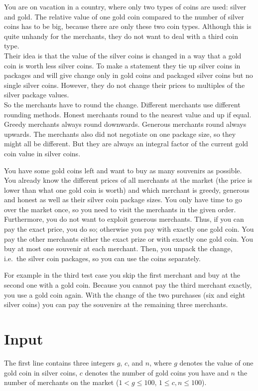 
You are on vacation in a country, where only two types of coins are used: silver and
gold. The relative value of one gold coin compared to the number of
silver coins has to be big, because there are only these two coin types.
Although this is quite unhandy for the merchants, they do not want to deal with
a third coin type.\\
Their idea is that the value of the silver coins is changed in a way that a
gold coin is worth less silver coins. To make a statement they tie up silver
coins in packages and will give change only in gold coins and packaged silver
coins but no single silver coins.  However, they do not change their prices to
multiples of the silver package values.\\
So the merchants have to round the change.
Different merchants use different rounding methods. Honest merchants round to
the nearest value and up if equal. Greedy merchants always round downwards.
Generous merchants round always upwards. The merchants also did not negotiate
on one package size, so they might all be different. But they are always an integral
factor of the current gold coin value in silver coins.

You have some gold coins left and want to buy as many souvenirs as possible.
You already know the different prices of all merchants at the market
(the price is lower than what one gold coin is worth) and which
merchant is greedy, generous and honest as well as their silver coin package
sizes. You only have time to go over the market once, so you need to visit the
merchants in the given order. Furthermore, you do not want to exploit generous
merchants. Thus, if you can pay the exact price, you do so; otherwise you pay
with exactly one gold coin. You pay the other merchants either the exact prize or
with exactly one gold coin. You buy at most one souvenir at each merchant. Then, you
unpack the change, i.e.~the silver coin packages, so you can use the coins separately.

For example in the third test case you skip the first merchant and buy at the
second one with a gold coin. Because you cannot pay the third merchant exactly,
you use a gold coin again. With the change of the two purchases (six and eight
silver coins) you can pay the souvenirs at the remaining three merchants.

\section*{Input}
The first line contains three integers $g$, $c$, and $n$, where $g$ denotes the
value of one gold coin in silver coins, $c$ denotes the number of gold coins
you have and $n$ the number of merchants on the market 
($1 < g \leq 100$, $1 \leq c, n \leq 100$).

